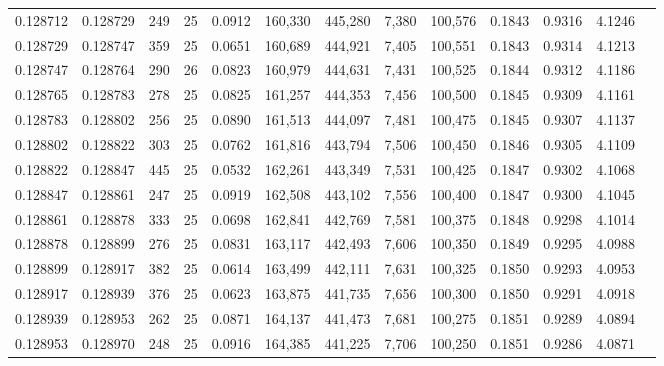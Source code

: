 \begin{tabular}{rrrrrrrrrrrrr}
0.128712 & 0.128729 &   249 &  25 &                                     0.0912 & 160,330 & 445,280 &   7,380 & 100,576 & 0.1843 & 0.9316 & 4.1246 \\
0.128729 & 0.128747 &   359 &  25 &                                     0.0651 & 160,689 & 444,921 &   7,405 & 100,551 & 0.1843 & 0.9314 & 4.1213 \\
0.128747 & 0.128764 &   290 &  26 &                                     0.0823 & 160,979 & 444,631 &   7,431 & 100,525 & 0.1844 & 0.9312 & 4.1186 \\
0.128765 & 0.128783 &   278 &  25 &                                     0.0825 & 161,257 & 444,353 &   7,456 & 100,500 & 0.1845 & 0.9309 & 4.1161 \\
0.128783 & 0.128802 &   256 &  25 &                                     0.0890 & 161,513 & 444,097 &   7,481 & 100,475 & 0.1845 & 0.9307 & 4.1137 \\
0.128802 & 0.128822 &   303 &  25 &                                     0.0762 & 161,816 & 443,794 &   7,506 & 100,450 & 0.1846 & 0.9305 & 4.1109 \\
0.128822 & 0.128847 &   445 &  25 &                                     0.0532 & 162,261 & 443,349 &   7,531 & 100,425 & 0.1847 & 0.9302 & 4.1068 \\
0.128847 & 0.128861 &   247 &  25 &                                     0.0919 & 162,508 & 443,102 &   7,556 & 100,400 & 0.1847 & 0.9300 & 4.1045 \\
0.128861 & 0.128878 &   333 &  25 &                                     0.0698 & 162,841 & 442,769 &   7,581 & 100,375 & 0.1848 & 0.9298 & 4.1014 \\
0.128878 & 0.128899 &   276 &  25 &                                     0.0831 & 163,117 & 442,493 &   7,606 & 100,350 & 0.1849 & 0.9295 & 4.0988 \\
0.128899 & 0.128917 &   382 &  25 &                                     0.0614 & 163,499 & 442,111 &   7,631 & 100,325 & 0.1850 & 0.9293 & 4.0953 \\
0.128917 & 0.128939 &   376 &  25 &                                     0.0623 & 163,875 & 441,735 &   7,656 & 100,300 & 0.1850 & 0.9291 & 4.0918 \\
0.128939 & 0.128953 &   262 &  25 &                                     0.0871 & 164,137 & 441,473 &   7,681 & 100,275 & 0.1851 & 0.9289 & 4.0894 \\
0.128953 & 0.128970 &   248 &  25 &                                     0.0916 & 164,385 & 441,225 &   7,706 & 100,250 & 0.1851 & 0.9286 & 4.0871 \\

\end{tabular}
